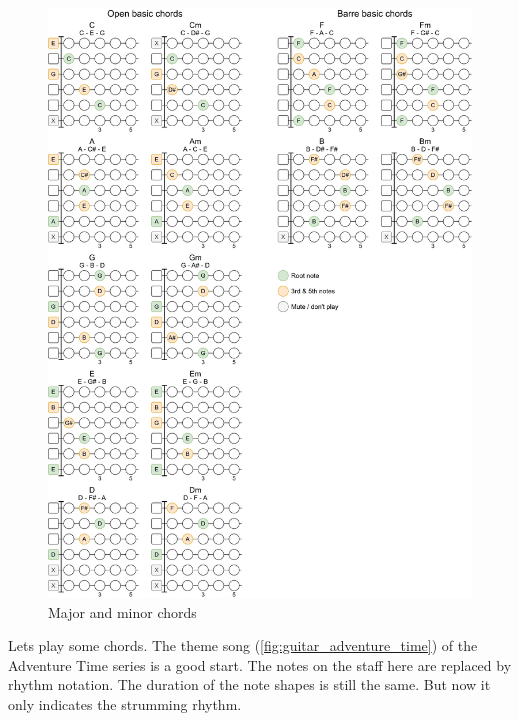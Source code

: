 \begin{figure}[h]
	\centering
	\includegraphics[height=0.9\textheight]{../../Images/GuitarBasicChords.png}
	\caption{Major and minor chords}
	\label{fig:guitar_major_minor_chords}
\end{figure}

\clearpage

Lets play some chords. The theme song (\autoref{fig:guitar_adventure_time}) of the Adventure Time series is a good start. The notes on the staff here are replaced by rhythm notation. The duration of the note shapes is still the same. But now it only indicates the strumming rhythm.

